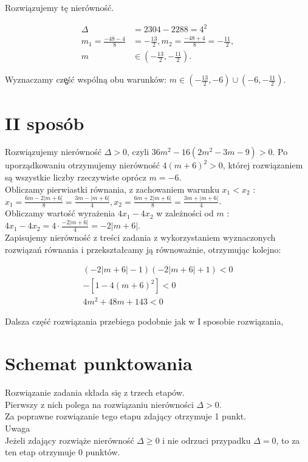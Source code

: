 \documentclass[10pt]{article}
\begin{document}
Rozwiązujemy tę nierówność.

$$
\begin{aligned}
\Delta & =2304-2288=4^{2} \\
m_{1}=\frac{-48-4}{8} & =-\frac{13}{2}, m_{2}=\frac{-48+4}{8}=-\frac{11}{2}, \\
m & \in\left(-\frac{13}{2},-\frac{11}{2}\right) .
\end{aligned}
$$

Wyznaczamy czę̧ść wspólną obu warunków: $m \in\left(-\frac{13}{2},-6\right) \cup\left(-6,-\frac{11}{2}\right)$.

\section*{II sposób}
Rozwiązujemy nierówność $\Delta>0$, czyli $36 m^{2}-16\left(2 m^{2}-3 m-9\right)>0$. Po uporządkowaniu otrzymujemy nierówność $4(m+6)^{2}>0$, której rozwiązaniem są wszystkie liczby rzeczywiste oprócz $m=-6$.\\
Obliczamy pierwiastki równania, z zachowaniem warunku $x_{1}<x_{2}$ :\\
$x_{1}=\frac{6 m-2|m+6|}{8}=\frac{3 m-|m+6|}{4}, x_{2}=\frac{6 m+2|m+6|}{8}=\frac{3 m+|m+6|}{4}$.\\
Obliczamy wartość wyrażenia $4 x_{1}-4 x_{2}$ w zależności od $m$ :\\
$4 x_{1}-4 x_{2}=4 \cdot \frac{-2|m+6|}{4}=-2|m+6|$.\\
Zapisujemy nierówność z treści zadania z wykorzystaniem wyznaczonych rozwiązań równania i przekształcamy ją równoważnie, otrzymując kolejno:

$$
\begin{gathered}
(-2|m+6|-1)(-2|m+6|+1)<0 \\
-\left[1-4(m+6)^{2}\right]<0 \\
4 m^{2}+48 m+143<0
\end{gathered}
$$

Dalsza część rozwiązania przebiega podobnie jak w I sposobie rozwiązania,

\section*{Schemat punktowania}
Rozwiązanie zadania składa się z trzech etapów.\\
Pierwszy z nich polega na rozwiązaniu nierówności $\Delta>0$.\\
Za poprawne rozwiązanie tego etapu zdający otrzymuje 1 punkt.\\
Uwaga\\
Jeżeli zdający rozwiąże nierówność $\Delta \geq 0$ i nie odrzuci przypadku $\Delta=0$, to za ten etap otrzymuje 0 punktów.
\end{document}
